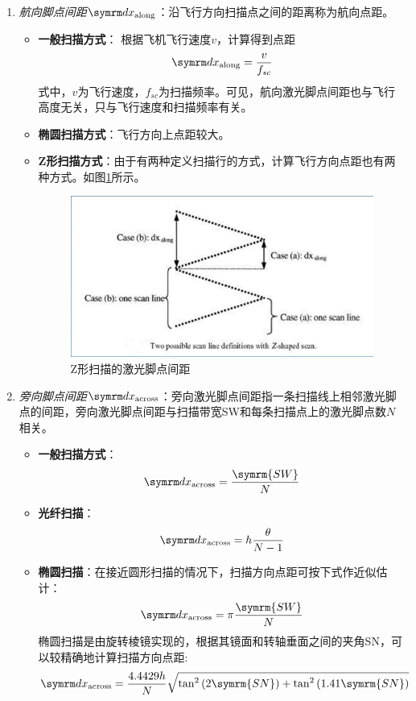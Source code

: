 \begin{enumerate}
	\item \textit{航向脚点间距$ \diff x_{\text{along}} $}：沿飞行方向扫描点之间的距离称为航向点距。
		\begin{itemize}
			\item \textbf{一般扫描方式}：
				根据飞机飞行速度$ v $，计算得到点距
				\begin{equation}
				\diff x_{\text{along}} = \dfrac{v}{f_{sc}}
				\end{equation}
				式中，$ v $为飞行速度，$ f_{sc} $为扫描频率。可见，航向激光脚点间距也与飞行高度无关，只与飞行速度和扫描频率有关。
			\item \textbf{椭圆扫描方式}：飞行方向上点距较大。
			\item \textbf{Z形扫描方式}：由于有两种定义扫描行的方式，计算飞行方向点距也有两种方式。如图\ref{fig:Z形扫描的激光脚点间距}所示。
				\begin{figure}[htbp]
					\centering
					\includegraphics[width=0.5\linewidth]{figure/Chapter4/Z形扫描的激光脚点间距}
					\caption{Z形扫描的激光脚点间距}
					\label{fig:Z形扫描的激光脚点间距}
				\end{figure}
		\end{itemize} %
	\item \textit{旁向脚点间距$ \diff x_{\text{across}} $}：旁向激光脚点间距指一条扫描线上相邻激光脚点的间距，旁向激光脚点间距与扫描带宽SW和每条扫描点上的激光脚点数$ N $相关。
		\begin{itemize}
			\item \textbf{一般扫描方式}：
				\begin{equation}
				\diff x_{\text{across}} = \dfrac{\symrm{SW}}{N}
				\end{equation}
			\item \textbf{光纤扫描}：
				\begin{equation}
				\diff x_{\text{across}} = h \dfrac{\theta}{N-1}
				\end{equation}
			\item \textbf{椭圆扫描}：在接近圆形扫描的情况下，扫描方向点距可按下式作近似估计：
				\begin{equation}
				\diff x_{\text{across}} = \pi \dfrac{\symrm{SW}}{N}
				\end{equation}
				椭圆扫描是由旋转棱镜实现的，根据其镜面和转轴垂面之间的夹角SN，可以较精确地计算扫描方向点距:
				\begin{equation}
				\diff x_{\text{across}} = \dfrac{4.4429 h}{N} \sqrt{\tan^2 \left(2\symrm{SN}\right) + \tan^2 \left(1.41\symrm{SN}\right)}
				\end{equation}
		\end{itemize} %
\end{enumerate} %

